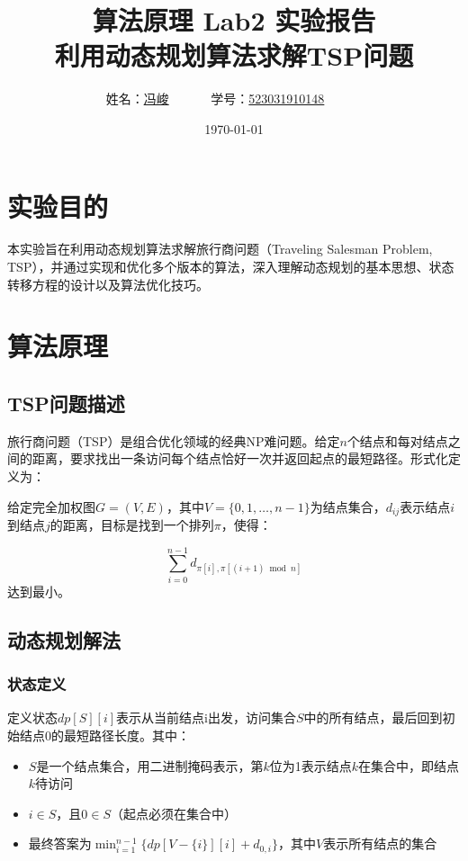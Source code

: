 \documentclass[UTF8,12pt,a4paper]{ctexart}
\title{算法原理 Lab2 实验报告 \\ 利用动态规划算法求解TSP问题}
\author{
	姓名：\underline{冯峻}~~~~~~
	学号：\underline{523031910148}~~~~~~}
\date{\today}
\begin{document}
\fancyfoot[C]{\thepage}

\maketitle
\tableofcontents
\newpage


\section{实验目的}

本实验旨在利用动态规划算法求解旅行商问题（Traveling Salesman Problem, TSP），并通过实现和优化多个版本的算法，深入理解动态规划的基本思想、状态转移方程的设计以及算法优化技巧。 

\section{算法原理}

\subsection{TSP问题描述}

旅行商问题（TSP）是组合优化领域的经典NP难问题。给定$n$个结点和每对结点之间的距离，要求找出一条访问每个结点恰好一次并返回起点的最短路径。形式化定义为：

给定完全加权图$G=(V,E)$，其中$V=\{0,1,\ldots,n-1\}$为结点集合，$d_{ij}$表示结点$i$到结点$j$的距离，目标是找到一个排列$\pi$，使得：

\begin{equation}
	\sum_{i=0}^{n-1} d_{\pi[i],\pi[(i+1)\bmod n]}
\end{equation}
达到最小。

\subsection{动态规划解法}

\subsubsection{状态定义}

定义状态$dp[S][i]$表示从当前结点i出发，访问集合$S$中的所有结点，最后回到初始结点0的最短路径长度。其中：
\begin{itemize}
	\item $S$是一个结点集合，用二进制掩码表示，第$k$位为1表示结点$k$在集合中，即结点$k$待访问
	\item $i \in S$，且$0 \in S$（起点必须在集合中）
	\item 最终答案为$\min_{i=1}^{n-1}\{dp[V-\{i\}][i] + d_{0,i}\}$，其中$V$表示所有结点的集合
\end{itemize}
\end{document}
